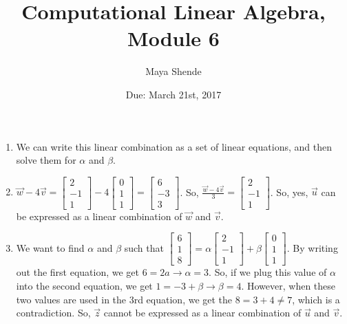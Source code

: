 \documentclass{article}
\title{Computational Linear Algebra, Module 6}
\author{Maya Shende}
\date{Due: March 21st, 2017}
\begin{document}
\maketitle

\begin{enumerate}

\item We can write this linear combination as a set of linear equations, and then solve them for $\alpha$ and $\beta$. 

\item $\overrightarrow{w} - 4\overrightarrow{v} = 
\begin{bmatrix}
	2\\
	-1\\
	1
\end{bmatrix}
- 4
\begin{bmatrix}
	0\\
	1\\
	1
\end{bmatrix}
= 
\begin{bmatrix}
	6\\
	-3\\
	3
\end{bmatrix}
$. So, $\frac{\overrightarrow{w} - 4\overrightarrow{v}}{3} = 
\begin{bmatrix}
	2\\
	-1\\
	1
\end{bmatrix}
$. So, yes, $\overrightarrow{u}$ can be expressed as a linear combination of $\overrightarrow{w}$ and $\overrightarrow{v}$. 

\item We want to find $\alpha$ and $\beta$ such that $
\begin{bmatrix}
	6\\
	1\\
	8
\end{bmatrix}
= \alpha
\begin{bmatrix}
	2\\
	-1\\
	1
\end{bmatrix}
+\beta
\begin{bmatrix}
	0\\
	1\\
	1
\end{bmatrix}
$. By writing out the first equation, we get $6 = 2a \rightarrow \alpha = 3$. So, if we plug this value of $\alpha$ into the second equation, we get $1 = -3 + \beta \rightarrow \beta = 4$. However, when these two values are used in the 3rd equation, we get the $8 = 3 + 4 \neq 7$, which is a contradiction. So, $\overrightarrow{z}$ cannot be expressed as a linear combination of $\overrightarrow{u}$ and $\overrightarrow{v}$. 


\end{enumerate}
\end{document}
